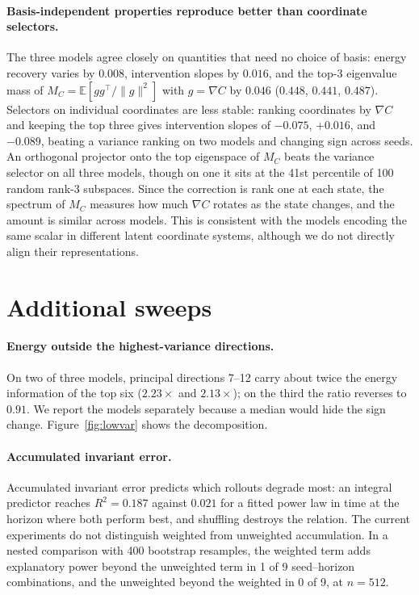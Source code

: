 \paragraph{Basis-independent properties reproduce better than coordinate selectors.} The three models
agree closely on quantities that need no choice of basis: energy recovery varies by $0.008$,
intervention slopes by $0.016$, and the top-3 eigenvalue mass of
$M_C = \mathbb{E}[gg^\top/\|g\|^2]$ with $g = \nabla C$ by $0.046$ ($0.448$, $0.441$, $0.487$).
Selectors on individual coordinates are less stable: ranking coordinates by $\nabla C$ and keeping
the top three gives intervention slopes of $-0.075$, $+0.016$, and $-0.089$, beating a variance
ranking on two models and changing sign across seeds. An orthogonal projector onto the top eigenspace
of $M_C$ beats the variance selector on all three models, though on one it sits at the 41st
percentile of 100 random rank-3 subspaces. Since the correction is rank one at each state, the
spectrum of $M_C$ measures how much $\nabla C$ rotates as the state changes, and the amount is
similar across models. This is consistent with the models encoding the same scalar in different
latent coordinate systems, although we do not directly align their representations.

\section{Additional sweeps}
\label{sec:sweeps}

\paragraph{Energy outside the highest-variance directions.} On two of three models, principal
directions 7--12 carry about twice the energy information of the top six ($2.23\times$ and
$2.13\times$); on the third the ratio reverses to $0.91$. We report the models separately because a
median would hide the sign change. Figure~\ref{fig:lowvar} shows the decomposition.

\paragraph{Accumulated invariant error.} Accumulated invariant error predicts which rollouts degrade
most: an integral predictor reaches $R^2 = 0.187$ against $0.021$ for a fitted power law in time at
the horizon where both perform best, and shuffling destroys the relation. The current experiments do
not distinguish weighted from unweighted accumulation. In a nested comparison with 400 bootstrap
resamples, the weighted term adds explanatory power beyond the unweighted term in 1 of 9
seed--horizon combinations, and the unweighted beyond the weighted in 0 of 9, at $n = 512$.

